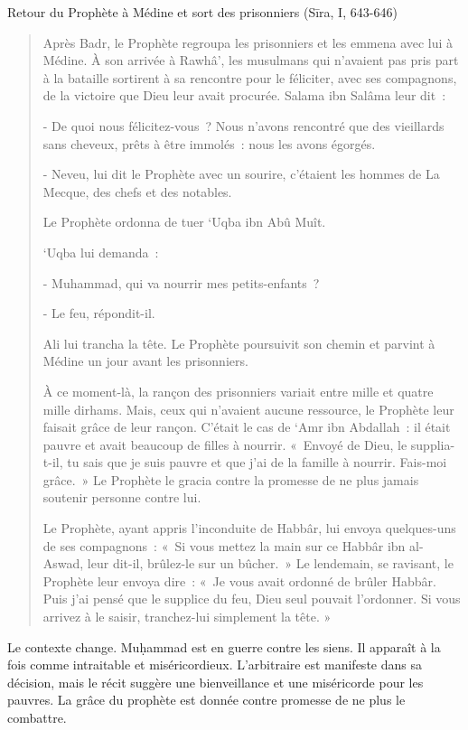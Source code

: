 Retour du Prophète à Médine et sort des prisonniers (Sīra, I, 643-646)
\begin{quote}

{Après Badr, le Prophète regroupa les prisonniers et les emmena
avec lui à Médine. À son arrivée à Rawhâ', les musulmans qui n'avaient
pas pris part à la bataille sortirent à sa rencontre pour le féliciter,
avec ses compagnons, de la victoire que Dieu leur avait procurée. Salama
ibn Salâma leur dit~:}

{- De quoi nous félicitez-vous~? Nous n'avons rencontré que des
vieillards sans cheveux, prêts à être immolés~: nous les avons égorgés.}

{- Neveu, lui dit le Prophète avec un sourire, c'étaient les hommes
de La Mecque, des chefs et des notables.}

{Le Prophète ordonna de tuer `Uqba ibn Abû Muît.}

{`Uqba lui demanda~:}

{- Muhammad, qui va nourrir mes petits-enfants~?}

{- Le feu, répondit-il.}

{Ali lui trancha la tête. Le Prophète poursuivit son chemin et
parvint à Médine un jour avant les prisonniers.}

{À ce moment-là, la rançon des prisonniers variait entre mille et
quatre mille dirhams. Mais, ceux qui n'avaient aucune ressource, le
Prophète leur faisait grâce de leur rançon. C'était le cas de `Amr ibn
Abdallah~: il était pauvre et avait beaucoup de filles à nourrir.
«~Envoyé de Dieu, le supplia-t-il, tu sais que je suis pauvre et que
j'ai de la famille à nourrir. Fais-moi grâce.~» Le Prophète le gracia
contre la promesse de ne plus jamais soutenir personne contre lui.}

{Le Prophète, ayant appris l'inconduite de Habbâr, lui envoya
quelques-uns de ses compagnons~: «~Si vous mettez la main sur ce Habbâr
ibn al-Aswad, leur dit-il, brûlez-le sur un bûcher.~» Le lendemain, se
ravisant, le Prophète leur envoya dire~: «~Je vous avait ordonné de
brûler Habbâr. Puis j'ai pensé que le supplice du feu, Dieu seul pouvait
l'ordonner. Si vous arrivez à le saisir, tranchez-lui simplement la
tête. »}
    
\end{quote}
Le contexte change. Muḥammad est en guerre contre les siens. Il apparaît
à la fois comme intraitable et miséricordieux. L'arbitraire est
manifeste dans sa décision, mais le récit suggère une bienveillance et
une miséricorde pour les pauvres. La grâce du prophète est donnée contre
promesse de ne plus le combattre.


